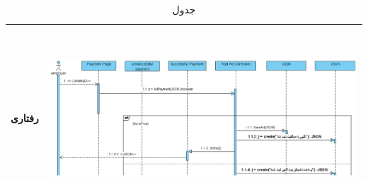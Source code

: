 \begin{table}[H]
\begin{adjustbox}{width=\textwidth}
\begin{tabular}{|c|p{\textwidth}|}
\\
\hline
رفتاری & 
\begin{minipage}{\textwidth}
	\begin{flushleft}
		\begin{minipage}{\textwidth}
			\includegraphics[width=13.5cm, height=6cm]{./images/7-1-2}
		\end{minipage}
	\end{flushleft}
\end{minipage}
\\
\hline
\end{tabular}
\end{adjustbox}
\caption{جدول }
\label{table-with-pic:1}
\end{table}

